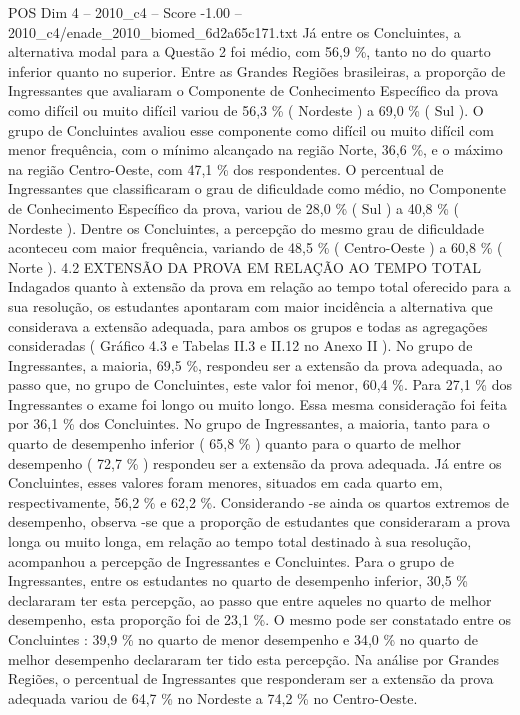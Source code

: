 \begin{textsample}{POS Dim 4 – 2010\_c4 – Score -1.00 – 2010\_c4/enade\_2010\_biomed\_6d2a65c171.txt}
Já entre os Concluintes, a alternativa modal para a Questão 2 foi médio, com 56,9 \%, tanto no do quarto inferior quanto no superior.
Entre as Grandes Regiões brasileiras, a proporção de Ingressantes que avaliaram o Componente de Conhecimento Específico da prova como difícil ou muito difícil variou de 56,3 \% ( Nordeste ) a 69,0 \% ( Sul ).
O grupo de Concluintes avaliou esse componente como difícil ou muito difícil com menor frequência, com o mínimo alcançado na região Norte, 36,6 \%, e o máximo na região Centro-Oeste, com 47,1 \% dos respondentes.
O percentual de Ingressantes que classificaram o grau de dificuldade como médio, no Componente de Conhecimento Específico da prova, variou de 28,0 \% ( Sul ) a 40,8 \% ( Nordeste ).
Dentre os Concluintes, a percepção do mesmo grau de dificuldade aconteceu com maior frequência, variando de 48,5 \% ( Centro-Oeste ) a 60,8 \% ( Norte ). 4.2 EXTENSÃO DA PROVA EM RELAÇÃO AO TEMPO TOTAL Indagados quanto à extensão da prova em relação ao tempo total oferecido para a sua resolução, os estudantes apontaram com maior incidência a alternativa que considerava a extensão adequada, para ambos os grupos e todas as agregações consideradas ( Gráfico 4.3 e Tabelas II.3 e II.12 no Anexo II ).
No grupo de Ingressantes, a maioria, 69,5 \%, respondeu ser a extensão da prova adequada, ao passo que, no grupo de Concluintes, este valor foi menor, 60,4 \%.
Para 27,1 \% dos Ingressantes o exame foi longo ou muito longo.
Essa mesma consideração foi feita por 36,1 \% dos Concluintes.
No grupo de Ingressantes, a maioria, tanto para o quarto de desempenho inferior ( 65,8 \% ) quanto para o quarto de melhor desempenho ( 72,7 \% ) respondeu ser a extensão da prova adequada.
Já entre os Concluintes, esses valores foram menores, situados em cada quarto em, respectivamente, 56,2 \% e 62,2 \%.
Considerando -se ainda os quartos extremos de desempenho, observa -se que a proporção de estudantes que consideraram a prova longa ou muito longa, em relação ao tempo total destinado à sua resolução, acompanhou a percepção de Ingressantes e Concluintes.
Para o grupo de Ingressantes, entre os estudantes no quarto de desempenho inferior, 30,5 \% declararam ter esta percepção, ao passo que entre aqueles no quarto de melhor desempenho, esta proporção foi de 23,1 \%.
O mesmo pode ser constatado entre os Concluintes : 39,9 \% no quarto de menor desempenho e 34,0 \% no quarto de melhor desempenho declararam ter tido esta percepção.
Na análise por Grandes Regiões, o percentual de Ingressantes que responderam ser a extensão da prova adequada variou de 64,7 \% no Nordeste a 74,2 \% no Centro-Oeste.

\end{textsample}
